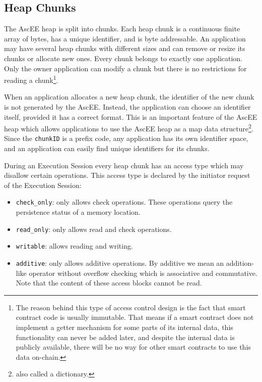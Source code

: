 \subsection{Heap Chunks}\label{subsec:heap}

The AscEE heap is split into chunks. Each heap chunk is a continuous finite array of bytes, has a unique identifier, and
is byte addressable. An application may have several heap chunks with different sizes and can remove or
resize its chunks or allocate new ones. Every chunk belongs to exactly one application. Only the owner application can
modify a chunk but there is no restrictions for reading a chunk\footnote{The reason behind this type of access
control design is the fact that smart contract
code is usually immutable. That means if a smart contract does not implement a
getter mechanism for some parts of its internal data, this functionality can never
be added later, and despite the internal data is publicly available, there will be no
way for other smart contracts to use this data on-chain.}.

When an application allocates a new heap chunk, the identifier of the new chunk is not generated by
the AscEE. Instead, the application can choose an identifier itself, provided it has a correct format. This
is an important feature of the AscEE heap which allows applications to use the AscEE heap as a map
data structure\footnote{also called a dictionary.}.
Since the \texttt{chunkID} is a prefix code, any application has its own identifier space, and an application
can easily find unique identifiers for its chunks.

During an Execution Session every heap chunk has an access type which may disallow certain operations. This access
type is declared by the initiator request of the Execution Session:

\begin{itemize}
    \item \texttt{check\_only}: only allows check operations. These operations query the persistence
    status of a memory location.
    \item \texttt{read\_only}: only allows read and check operations.
    \item \texttt{writable}: allows reading and writing.
    \item \texttt{additive}: only allows additive operations. By additive we mean an addition-like operator without
    overflow checking which is associative and commutative. Note that the content of these access blocks cannot be read.
\end{itemize}


